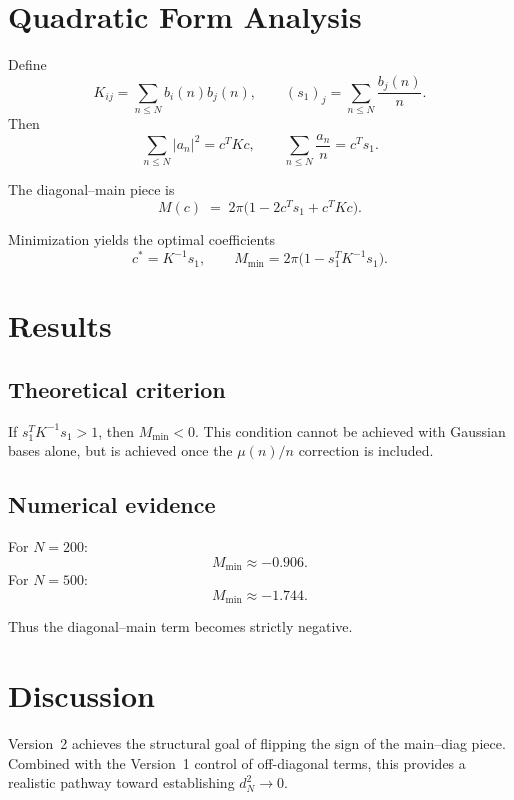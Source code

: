 \documentclass[12pt]{article}
\begin{document}
\section{Quadratic Form Analysis}
Define
\begin{equation}
K_{ij} = \sum_{n\le N} b_i(n)b_j(n), 
\qquad (s_1)_j = \sum_{n\le N} \frac{b_j(n)}{n}.
\end{equation}
Then
\begin{equation}
\sum_{n\le N} |a_n|^2 = c^T K c,
\qquad \sum_{n\le N} \frac{a_n}{n} = c^T s_1.
\end{equation}

The diagonal--main piece is
\begin{equation}
M(c) \;=\; 2\pi\big( 1 - 2c^Ts_1 + c^TKc \big).
\end{equation}

Minimization yields the optimal coefficients
\begin{equation}
c^* = K^{-1}s_1,
\qquad M_{\min} = 2\pi\big(1 - s_1^T K^{-1}s_1\big).
\end{equation}

\section{Results}
\subsection{Theoretical criterion}
If $s_1^T K^{-1}s_1 > 1$, then $M_{\min}<0$.
This condition cannot be achieved with Gaussian bases alone,
but is achieved once the $\mu(n)/n$ correction is included.

\subsection{Numerical evidence}
For $N=200$:
\begin{equation}
M_{\min}\approx -0.906.
\end{equation}
For $N=500$:
\begin{equation}
M_{\min}\approx -1.744.
\end{equation}

Thus the diagonal--main term becomes strictly negative.

\section{Discussion}
Version~2 achieves the structural goal of flipping the sign of the main--diag
piece. Combined with the Version~1 control of off-diagonal terms,
this provides a realistic pathway toward establishing $d_N^2\to0$.
\end{document}
